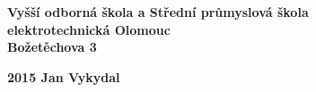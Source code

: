 \begin{titlepage}
	\setcounter{page}{1}
	\begin{center}

	{\LARGE \bfseries Vyšší odborná škola a Střední průmyslová škola}\\[2mm] 

	{\LARGE \bfseries elektrotechnická Olomouc}\\[2mm]  

	{\LARGE \bfseries Božetěchova 3}\\[65mm]



	


	\vfill

	{\LARGE \bfseries 2015 \hfill Jan Vykydal}

	\end{center}
\end{titlepage}
